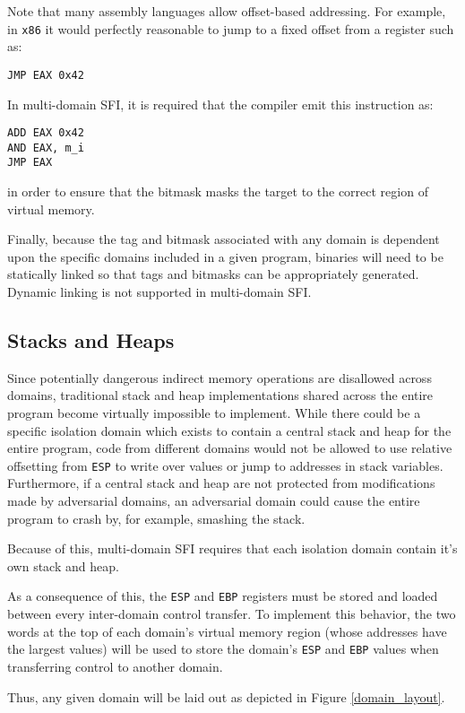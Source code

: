 \documentclass[12pt]{article}
\begin{document}
Note that many assembly languages allow offset-based addressing. For example, in \texttt{x86} it would perfectly reasonable to jump to a fixed offset from a register such as:
\begin{verbatim}
JMP EAX 0x42
\end{verbatim}
In multi-domain SFI, it is required that the compiler emit this instruction as:
\begin{verbatim}
ADD EAX 0x42
AND EAX, m_i
JMP EAX
\end{verbatim}
in order to ensure that the bitmask masks the target to the correct region of virtual memory.

Finally, because the tag and bitmask associated with any domain is dependent upon the specific domains included in a given program, binaries will need to be statically linked so that tags and bitmasks can be appropriately generated. Dynamic linking is not supported in multi-domain SFI.


\subsection{Stacks and Heaps}

Since potentially dangerous indirect memory operations are disallowed across domains, traditional stack and heap implementations shared across the entire program become virtually impossible to implement. While there could be a specific isolation domain which exists to contain a central stack and heap for the entire program, code from different domains would not be allowed to use relative offsetting from \texttt{ESP} to write over values or jump to addresses in stack variables. Furthermore, if a central stack and heap are not protected from modifications made by adversarial domains, an adversarial domain could cause the entire program to crash by, for example, smashing the stack.

Because of this, multi-domain SFI requires that each isolation domain contain it's own stack and heap.

As a consequence of this, the  \texttt{ESP} and \texttt{EBP} registers must be stored and loaded between every inter-domain control transfer. To implement this behavior, the two words at the top of each domain's virtual memory region (whose addresses have the largest values) will be used to store the domain's \texttt{ESP} and \texttt{EBP} values when transferring control to another domain.

Thus, any given domain will be laid out as depicted in Figure \ref{domain_layout}.
\end{document}
